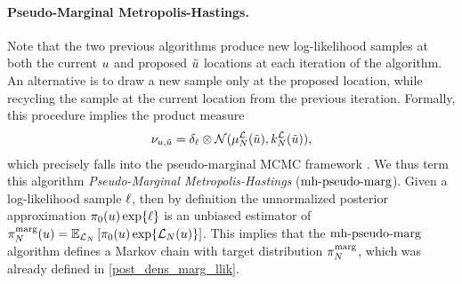 \documentclass[12pt]{article}
\begin{document}
\paragraph{Pseudo-Marginal Metropolis-Hastings.}
Note that the two previous algorithms produce new log-likelihood samples at both the current $\Par$ and proposed 
$\propPar$ locations at each iteration of the algorithm. An alternative is to draw a new sample only at the 
proposed location, while recycling the sample at the current location from the previous iteration. Formally, this procedure
implies the product measure 
\begin{align}
\llikSampDist_{\Par, \propPar} 
= \delta_{\llikSamp} \otimes  
\Gaussian(\emMean[\Ndesign]{\llik}(\propPar), \emKer[\Ndesign]{\llik}(\propPar)), \label{llik_dist_pseudo_marg}
\end{align}
which precisely falls into the pseudo-marginal MCMC framework \cite{pseudoMarginalMCMC}. 
We thus term 
this algorithm \textit{Pseudo-Marginal Metropolis-Hastings} ($\mhPseudoMargLabel$). Given a log-likelihood sample 
$\llikSamp$, then by definition the unnormalized posterior approximation $\priorDens(\Par) \Exp{\llikSamp}$ is 
an unbiased estimator of 
$\llikEmMargDens[\Ndesign](\Par) = \E_{\llikEm[\Ndesign]}\left[\priorDens(\Par) \Exp{\llikEm[\Ndesign](\Par)} \right]$. 
This implies that the $\mhPseudoMargLabel$ algorithm defines a Markov chain with target distribution 
$\llikEmMargDens[\Ndesign]$, which was already defined in \ref{post_dens_marg_llik}. 

\end{document}
